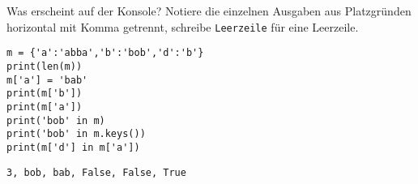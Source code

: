 \question[6] Was erscheint auf der Konsole?  
Notiere die einzelnen Ausgaben aus Platzgründen horizontal mit Komma getrennt,
schreibe \texttt{Leerzeile} für eine Leerzeile.
\begin{lstlisting}
m = {'a':'abba','b':'bob','d':'b'}
print(len(m))
m['a'] = 'bab'
print(m['b'])
print(m['a'])
print('bob' in m)
print('bob' in m.keys())
print(m['d'] in m['a'])
\end{lstlisting}
\begin{solutionbox}{1cm}
\texttt{3, bob, bab, False, False, True}
\end{solutionbox}
